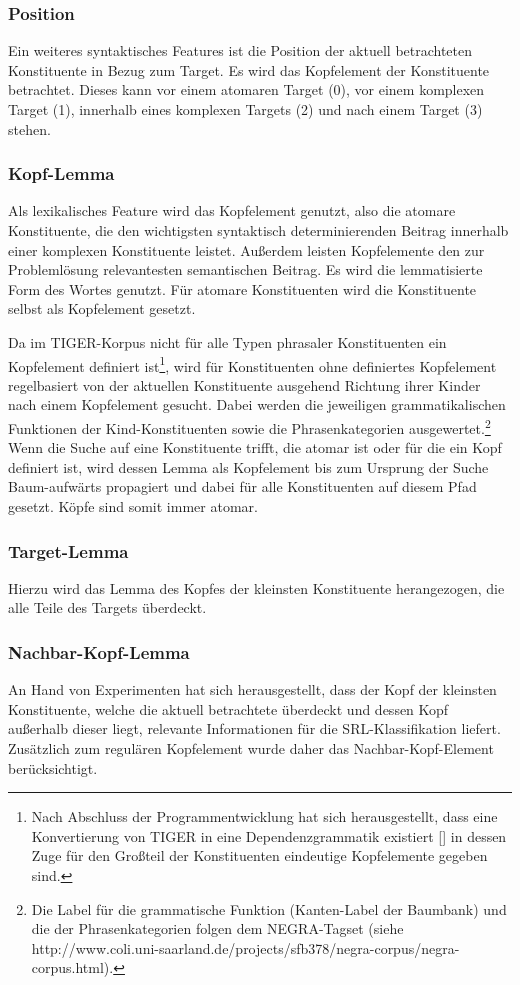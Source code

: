 \documentclass[12pt]{article}
\begin{document}
\subsubsection*{Position}
Ein weiteres syntaktisches Features ist die Position der aktuell betrachteten Konstituente in Bezug zum Target. Es wird das Kopfelement der Konstituente betrachtet. Dieses kann vor einem atomaren Target (0), vor einem komplexen Target (1), innerhalb eines komplexen Targets (2) und nach einem Target (3) stehen.
\subsubsection*{Kopf-Lemma}
Als lexikalisches Feature wird das Kopfelement genutzt, also die atomare Konstituente, die den wichtigsten syntaktisch determinierenden Beitrag innerhalb einer komplexen Konstituente leistet. Außerdem leisten Kopfelemente den zur Problemlösung relevantesten semantischen Beitrag. Es wird die lemmatisierte Form des Wortes genutzt. Für atomare Konstituenten
wird die Konstituente selbst als Kopfelement gesetzt.

Da im TIGER-Korpus nicht für alle Typen phrasaler Konstituenten ein Kopfelement definiert ist\footnote{Nach Abschluss der Programmentwicklung hat sich herausgestellt, dass eine Konvertierung von TIGER in eine Dependenzgrammatik existiert [\cite{kountz_extraktion_2006}] in dessen Zuge für den Großteil der Konstituenten eindeutige Kopfelemente gegeben sind.}, wird für Konstituenten ohne definiertes Kopfelement regelbasiert von der aktuellen Konstituente ausgehend Richtung ihrer Kinder nach einem Kopfelement gesucht. Dabei werden die jeweiligen grammatikalischen Funktionen der Kind-Konstituenten sowie die Phrasenkategorien ausgewertet.\footnote{Die Label für die grammatische Funktion (Kanten-Label der Baumbank) und die der Phrasenkategorien folgen dem NEGRA-Tagset (siehe http://www.coli.uni-saarland.de/projects/sfb378/negra-corpus/negra-corpus.html).} Wenn die Suche auf eine Konstituente trifft, die atomar ist oder für die ein Kopf definiert ist, wird dessen Lemma als Kopfelement bis zum Ursprung der Suche Baum-aufwärts propagiert und dabei für alle Konstituenten auf diesem Pfad gesetzt. Köpfe sind somit immer atomar.
\subsubsection*{Target-Lemma}
Hierzu wird das Lemma des Kopfes der kleinsten Konstituente herangezogen, die alle Teile des Targets überdeckt.
\subsubsection*{Nachbar-Kopf-Lemma}
An Hand von Experimenten hat sich herausgestellt, dass der Kopf der kleinsten Konstituente, welche die aktuell betrachtete überdeckt und dessen Kopf außerhalb dieser liegt, relevante Informationen für die SRL-Klassifikation liefert. Zusätzlich zum regulären Kopfelement wurde daher das Nachbar-Kopf-Element berücksichtigt.  
\end{document}
